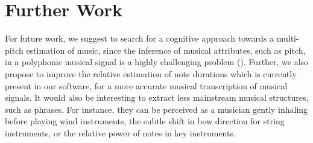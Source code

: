 \chapter*{Further Work}
\label{ch:furtherWork}


For future work, we suggest to search for a cognitive approach towards a multi-pitch estimation of music, since the inference of musical attributes, such as pitch, in a polyphonic musical signal is a highly challenging problem (\cite{benetos_automatic_2019}). Further, we also propose to improve the relative estimation of note durations which is currently present in our software, for a more accurate musical transcription of musical signals. It would also be interesting to extract less mainstream musical structures, such as phrases. For instance, they can be perceived as a musician gently inhaling before playing wind instruments, the subtle shift in bow direction for string instruments, or the relative power of notes in key instruments.
